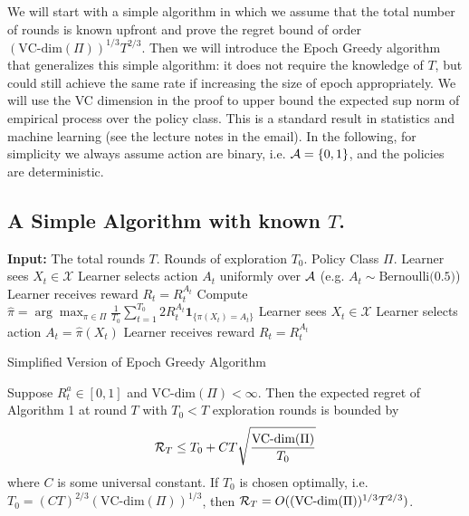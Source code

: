\documentclass[11pt]{article}
\begin{document}
We will start with a simple algorithm in which we assume that the total number of rounds is known upfront and prove the regret bound of order $(\text{VC-dim}(\Pi))^{1/3} T^{2/3}$.   Then we will introduce the Epoch Greedy algorithm that generalizes this simple algorithm: it does not require the knowledge of $T$, but could still achieve the same rate if increasing the size of epoch appropriately.   We will use the VC dimension in the proof to upper bound the expected sup norm of empirical process over the policy class.  This is a standard result in statistics \cite{van1996weak} and machine learning (see the lecture notes in the email).  In the following, for simplicity we always assume action are binary, i.e. $\mathcal{A} = \{0, 1\}$,  and the policies are deterministic. 

\subsection{A Simple Algorithm with known $T$.}

\begin{algorithm}[H]
	\begin{algorithmic}[1]
		\STATE \textbf{Input:} The total rounds $T$. Rounds of exploration $T_0$. Policy Class $\Pi$.  
		\STATE Learner sees $X_t \in \mathcal{X}$
		\STATE Learner selects action $A_t$ uniformly over $\mathcal{A}$ (e.g. $A_t \sim \text{Bernoulli(0.5)}$)
		\STATE Learner receives reward $R_t = R^{A_t}_t$
		\ENDFOR
		\STATE Compute $\hat \pi = \arg \max_{\pi \in \Pi} \frac{1}{T_0} \sum_{t=1}^{T_0} 2 R_t^{A_t} \mathbf{1}_{\{\pi(X_t) = A_t\}}$
		\STATE Learner sees $X_t \in \mathcal{X}$
		\STATE Learner selects action $A_t = \hat \pi(X_t)$
		\STATE Learner receives reward $R_t = R^{A_t}_t$
		\ENDFOR
	\end{algorithmic}
	\label{Sim Alg}
	\caption{Simplified Version of Epoch Greedy Algorithm}
\end{algorithm}
\begin{theorem}
	\label{thm1}
	Suppose $R_t^a \in [0, 1]$ and $\text{VC-dim}(\Pi) < \infty$. Then the expected regret of Algorithm 1 at round $T$ with $T_0 < T$ exploration rounds is bounded by
	\[
	\mathcal{R}_T \leq T_0 + C T \sqrt{\frac{\text{VC-dim}(\Pi)}{T_0}}
	\]
	where $C$ is some universal constant. If $T_0$ is chosen optimally, i.e. $T_0 = (CT) ^{2/3}(\text{VC-dim}(\Pi))^{1/3}$, then $\mathcal{R}_T =  O((\text{VC-dim}(\Pi))^{1/3} T^{2/3} )$.
\end{theorem}
\end{document}
